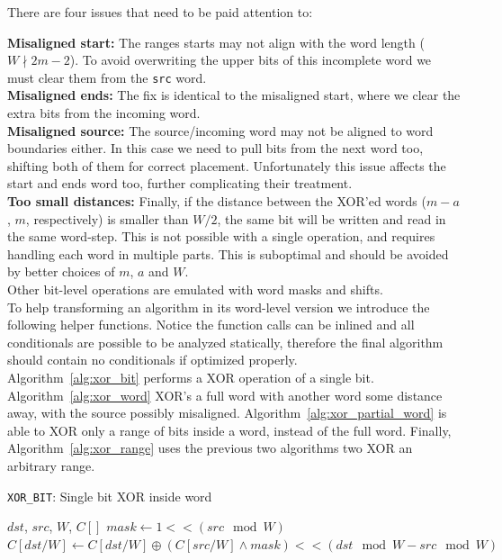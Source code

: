There are four issues that need to be paid attention to:

\textbf{Misaligned start:}
The ranges starts may not align with the word length ($W \nmid 2m-2$). To avoid overwriting the upper bits of this incomplete word we must clear them from the \texttt{src} word. \\

\textbf{Misaligned ends:}
The fix is identical to the misaligned start, where we clear the extra bits from the incoming word. \\

\textbf{Misaligned source:}
The source/incoming word may not be aligned to word boundaries either. In this case we need to pull bits from the next word too, shifting both of them for correct placement. Unfortunately this issue affects the start and ends word too, further complicating their treatment. \\

\textbf{Too small distances:}
Finally, if the distance between the XOR'ed words ($m-a$, $m$, respectively) is smaller than $W/2$, the same bit will be written and read in the same word-step. This is not possible with a single operation, and requires handling each word in multiple parts. This is suboptimal and should be avoided by better choices of $m$, $a$ and $W$. \\

Other bit-level operations are emulated with word masks and shifts. \\

To help transforming an algorithm in its word-level version we introduce the following helper functions. Notice the function calls can be inlined and all conditionals are possible to be analyzed statically, therefore the final algorithm should contain no conditionals if optimized properly. \\

Algorithm~\ref{alg:xor_bit} performs a XOR operation of a single bit. Algorithm~\ref{alg:xor_word} XOR's a full word with another word some distance away, with the source possibly misaligned. Algorithm~\ref{alg:xor_partial_word} is able to XOR only a range of bits inside a word, instead of the full word. Finally, Algorithm~\ref{alg:xor_range} uses the previous two algorithms two XOR an arbitrary range. \\

\begin{algorithm}
\caption{\texttt{XOR\_BIT}: Single bit XOR inside word}
\label{alg:xor_bit}
\begin{algorithmic}[1]
  \REQUIRE $dst$, $src$, $W$, $C[]$
  \STATE $mask \gets 1 << (src \mod W)$
  \STATE $C[dst / W] \gets C[dst / W] \oplus (C[src / W] \land mask) << (dst \mod W - src \mod W)$
\end{algorithmic}
\end{algorithm}

